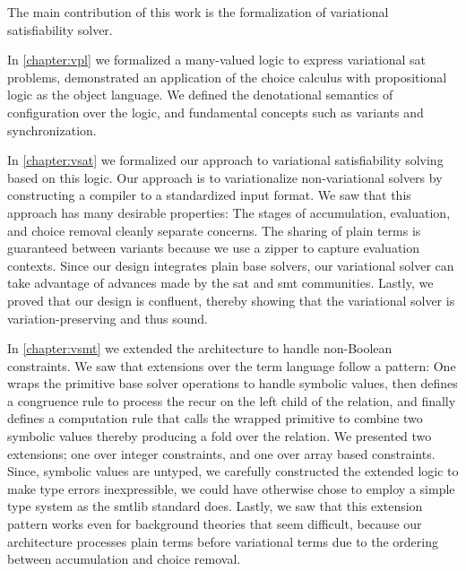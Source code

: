 \label{section:conclusion:cont-summary}

The main contribution of this work is the formalization of variational
satisfiability solver.

In \autoref{chapter:vpl} we formalized a many-valued logic to express
variational \ac{sat} problems, demonstrated an application of the choice
calculus with propositional logic as the object language. We defined the
denotational semantics of configuration over the logic, and fundamental concepts
such as variants and synchronization.

In \autoref{chapter:vsat} we formalized our approach to variational
satisfiability solving based on this logic. Our approach is to variationalize
non-variational solvers by constructing a compiler to a standardized input
format. We saw that this approach has many desirable properties: The stages of
accumulation, evaluation, and choice removal cleanly separate concerns. The
sharing of plain terms is guaranteed between variants because we use a zipper to
capture evaluation contexts. Since our design integrates plain base solvers, our
variational solver can take advantage of advances made by the \ac{sat} and
\ac{smt} communities. Lastly, we proved that our design is confluent, thereby
showing that the variational solver is variation-preserving and thus sound.

In \autoref{chapter:vsmt} we extended the architecture to handle non-Boolean
constraints. We saw that extensions over the term language follow a pattern: One
wraps the primitive base solver operations to handle symbolic values, then
defines a congruence rule to process the recur on the left child of the
relation, and finally defines a computation rule that calls the wrapped
primitive to combine two symbolic values thereby producing a fold over the
relation. We presented two extensions; one over integer constraints, and one
over array based constraints. Since, symbolic values are untyped, we carefully
constructed the extended logic to make type errors inexpressible, we could have
otherwise chose to employ a simple type system as the \acl{smtlib} standard
does. Lastly, we saw that this extension pattern works even for background
theories that seem difficult, because our architecture processes plain terms
before variational terms due to the ordering between accumulation and choice
removal.

